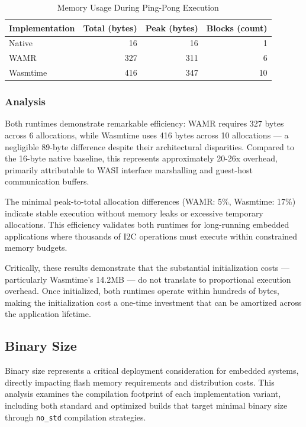 \begin{table}[H]
    \centering
    \caption{Memory Usage During Ping-Pong Execution}
    \label{tab:memory-execution}
    \begin{tabular}{lrrr}
        \toprule
        \textbf{Implementation} & \textbf{Total (bytes)} & \textbf{Peak (bytes)} & \textbf{Blocks (count)} \\
        \midrule
        Native        & 16   & 16  & 1 \\
        WAMR          & 327  & 311 & 6 \\
        Wasmtime      & 416  & 347 & 10 \\
        \bottomrule
    \end{tabular}
\end{table}

\subsubsection{Analysis}

Both runtimes demonstrate remarkable efficiency: WAMR requires 327 bytes across 6 allocations, while Wasmtime uses 416 bytes across 10 allocations --- a negligible 89-byte difference despite their architectural disparities. Compared to the 16-byte native baseline, this represents approximately 20-26x overhead, primarily attributable to WASI interface marshalling and guest-host communication buffers.

The minimal peak-to-total allocation differences (WAMR: 5\%, Wasmtime: 17\%) indicate stable execution without memory leaks or excessive temporary allocations. This efficiency validates both runtimes for long-running embedded applications where thousands of I2C operations must execute within constrained memory budgets.

Critically, these results demonstrate that the substantial initialization costs --- particularly Wasmtime's 14.2MB --- do not translate to proportional execution overhead. Once initialized, both runtimes operate within hundreds of bytes, making the initialization cost a one-time investment that can be amortized across the application lifetime.

\subsection{Binary Size}
\label{subsec:binary-size}

Binary size represents a critical deployment consideration for embedded systems, directly impacting flash memory requirements and distribution costs. This analysis examines the compilation footprint of each implementation variant, including both standard and optimized builds that target minimal binary size through \texttt{no\_std} compilation strategies.


